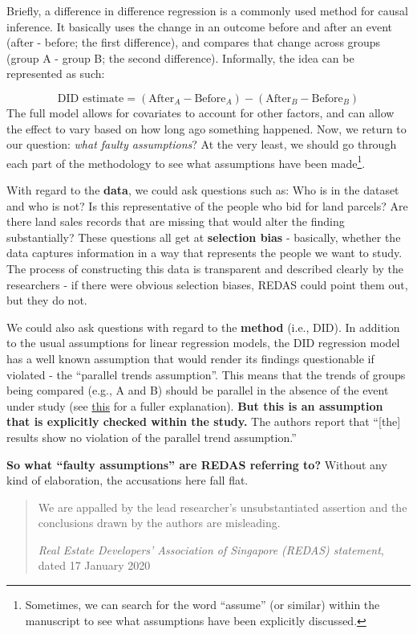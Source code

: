 \documentclass[
  openany]{book}
\begin{document}
Briefly, a difference in difference regression is a commonly used method for causal inference. It basically uses the change in an outcome before and after an event (after - before; the first difference), and compares that change across groups (group A - group B; the second difference). Informally, the idea can be represented as such:

\[
\text{DID estimate} = (\text{After}_A-\text{Before}_A) - (\text{After}_B-\text{Before}_B) 
\]
The full model allows for covariates to account for other factors, and can allow the effect to vary based on how long ago something happened. Now, we return to our question: \emph{what faulty assumptions}? At the very least, we should go through each part of the methodology to see what assumptions have been made\footnote{Sometimes, we can search for the word ``assume'' (or similar) within the manuscript to see what assumptions have been explicitly discussed.}.

With regard to the \textbf{data}, we could ask questions such as: Who is in the dataset and who is not? Is this representative of the people who bid for land parcels? Are there land sales records that are missing that would alter the finding substantially? These questions all get at \textbf{selection bias} - basically, whether the data captures information in a way that represents the people we want to study. The process of constructing this data is transparent and described clearly by the researchers - if there were obvious selection biases, REDAS could point them out, but they do not.

We could also ask questions with regard to the \textbf{method} (i.e., DID). In addition to the usual assumptions for linear regression models, the DID regression model has a well known assumption that would render its findings questionable if violated - the ``parallel trends assumption''. This means that the trends of groups being compared (e.g., A and B) should be parallel in the absence of the event under study (see \href{https://www.mailman.columbia.edu/research/population-health-methods/difference-difference-estimation}{this} for a fuller explanation). \textbf{But this is an assumption that is explicitly checked within the study.} The authors report that ``{[}the{]} results show no violation of the parallel trend assumption.''

\textbf{So what ``faulty assumptions'' are REDAS referring to?} Without any kind of elaboration, the accusations here fall flat.

\begin{quote}
We are appalled by the lead researcher's unsubstantiated assertion and the conclusions drawn by the authors are misleading.

\emph{Real Estate Developers' Association of Singapore (REDAS) statement}, dated 17 January 2020
\end{quote}
\end{document}
